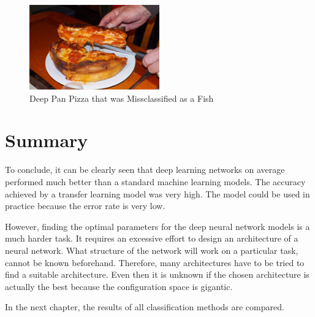 \begin{figure}[h]
\centering
\includegraphics[width=0.5\textwidth]{Figures/4/4.jpg}
\caption{Deep Pan Pizza that was Missclassified as a Fish}
\label{fig:miss}
\end{figure}




\section{Summary}

To conclude, it can be clearly seen that deep learning networks on average performed much better than a standard machine learning models. The accuracy achieved by a transfer learning model was very high. The model could be used in practice because the error rate is very low.

However, finding the optimal parameters for the deep neural network models is a much harder task. It requires an excessive effort to design an architecture of a neural network. What structure of the network will work on a particular task,  cannot be known beforehand. Therefore, many architectures have to be tried to find a suitable architecture. Even then it is unknown if the chosen architecture is actually the best because the configuration space is gigantic.

In the next chapter, the results of all classification methods are compared.